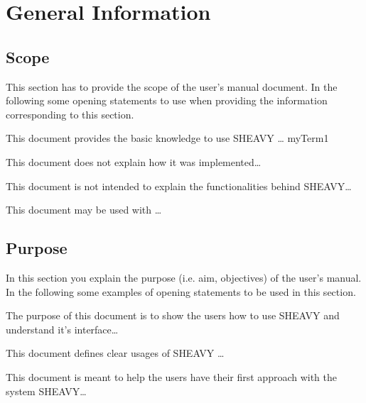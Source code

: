 \chapter{General Information}
\usepackage{glossaries}
\makeglossaries
{}
\label{chap:introduction}

\section{Scope}
This section has to provide the scope of the user's manual document.
In the following some opening statements to use when providing the
information corresponding to this section.

This document provides the basic knowledge to use SHEAVY \ldots
\gls{myTerm1} 

This document does not explain how it was implemented\ldots 
 
This document is not intended to explain the functionalities behind SHEAVY\ldots

 
This document may be used with \ldots




\section{Purpose}
In this section you explain the purpose (i.e. aim, objectives) of the user's
manual. In the following some examples of opening statements to be used in this
section.

The purpose of this document is to show the users how to use SHEAVY and
understand it's interface\ldots

This document defines clear usages of SHEAVY \ldots

This document is meant to help the users have their first approach with
the system SHEAVY\ldots



